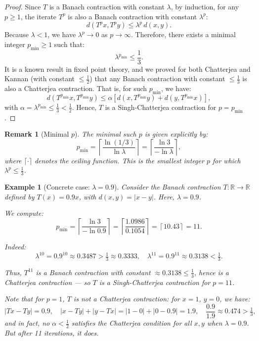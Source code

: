 \documentclass[12pt]{article}
\newtheorem{example}[theorem]{Example}
\newtheorem{remark}[theorem]{Remark}
\begin{document}
\begin{proof}
Since $ T $ is a Banach contraction with constant $ \lambda $, by induction, for any $ p \geq 1 $, the iterate $ T^p $ is also a Banach contraction with constant $ \lambda^p $:
\[
d(T^p x, T^p y) \leq \lambda^p \, d(x, y).
\]
Because $ \lambda < 1 $, we have $ \lambda^p \to 0 $ as $ p \to \infty $. Therefore, there exists a minimal integer $ p_{\min} \geq 1 $ such that:
\[
\lambda^{p_{\min}} \leq \frac{1}{3}.
\]
It is a known result in fixed point theory, and we proved for both Chatterjea and Kannan (with constant $\leq \frac{1}{2}$) that any Banach contraction with constant $ \leq \frac{1}{3} $ is also a Chatterjea contraction. That is, for such $ p_{\min} $, we have:
\[
d(T^{p_{\min}} x, T^{p_{\min}} y) \leq \alpha \left[ d(x, T^{p_{\min}} y) + d(y, T^{p_{\min}} x) \right],
\]
with $ \alpha = \lambda^{p_{\min}} \leq \frac{1}{3} < \frac{1}{2} $. Hence, $ T $ is a Singh-Chatterjea contraction for $ p = p_{\min} $.
\end{proof}

\begin{remark}[Minimal $ p $]
The minimal such $ p $ is given explicitly by:
\[
p_{\min} = \left\lceil \frac{\ln(1/3)}{\ln \lambda} \right\rceil = \left\lceil \frac{\ln 3}{-\ln \lambda} \right\rceil,
\]
where $ \lceil \cdot \rceil $ denotes the ceiling function. This is the smallest integer $ p $ for which $ \lambda^p \leq \frac{1}{3} $.
\end{remark}

\begin{example}[Concrete case: $ \lambda = 0.9 $]
Consider the Banach contraction $ T: \mathbb{R} \to \mathbb{R} $ defined by $ T(x) = 0.9x $, with $ d(x,y) = |x - y| $. Here, $ \lambda = 0.9 $.

We compute:
\[
p_{\min} = \left\lceil \frac{\ln 3}{-\ln 0.9} \right\rceil = \left\lceil \frac{1.0986}{0.1054} \right\rceil = \left\lceil 10.43 \right\rceil = 11.
\]

Indeed:
\[
\lambda^{10} = 0.9^{10} \approx 0.3487 > \tfrac{1}{3} \approx 0.3333, \quad
\lambda^{11} = 0.9^{11} \approx 0.3138 < \tfrac{1}{3}.
\]

Thus, $ T^{11} $ is a Banach contraction with constant $ \approx 0.3138 \leq \frac{1}{3} $, hence is a Chatterjea contraction — so $ T $ is a Singh-Chatterjea contraction for $ p = 11 $.

Note that for $ p = 1 $, $ T $ is \emph{not} a Chatterjea contraction: for $ x = 1 $, $ y = 0 $, we have:
\[
|Tx - Ty| = 0.9, \quad |x - Ty| + |y - Tx| = |1 - 0| + |0 - 0.9| = 1.9, \quad \frac{0.9}{1.9} \approx 0.474 > \tfrac{1}{3},
\]
and in fact, no $ \alpha < \tfrac{1}{2} $ satisfies the Chatterjea condition for all $ x,y $ when $ \lambda = 0.9 $. But after 11 iterations, it does.
\end{example}
\end{document}
